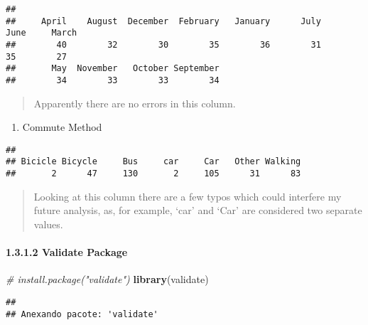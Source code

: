 \documentclass[
]{article}
\newenvironment{Shaded}{\begin{snugshade}}{\end{snugshade}}
\newcommand{\CommentTok}[1]{\textcolor[rgb]{0.56,0.35,0.01}{\textit{#1}}}
\newcommand{\FunctionTok}[1]{\textcolor[rgb]{0.13,0.29,0.53}{\textbf{#1}}}
\newcommand{\NormalTok}[1]{#1}
\newcommand{\SpecialCharTok}[1]{\textcolor[rgb]{0.81,0.36,0.00}{\textbf{#1}}}
\providecommand{\tightlist}{%
  \setlength{\itemsep}{0pt}\setlength{\parskip}{0pt}}
\begin{document}
\begin{verbatim}
## 
##     April    August  December  February   January      July      June     March 
##        40        32        30        35        36        31        35        27 
##       May  November   October September 
##        34        33        33        34
\end{verbatim}

\begin{quote}
Apparently there are no errors in this column.
\end{quote}

\begin{enumerate}
\def\labelenumi{\arabic{enumi}.}
\setcounter{enumi}{8}
\tightlist
\item
  Commute Method
\end{enumerate}

\begin{Shaded}
\end{Shaded}

\begin{verbatim}
## 
## Bicicle Bicycle     Bus     car     Car   Other Walking 
##       2      47     130       2     105      31      83
\end{verbatim}

\begin{quote}
Looking at this column there are a few typos which could interfere my
future analysis, as, for example, `car' and `Car' are considered two
separate values.
\end{quote}

\paragraph{1.3.1.2 Validate Package}\label{validate-package}

\begin{Shaded}
\begin{Highlighting}[]
\CommentTok{\# install.package("validate")}
\FunctionTok{library}\NormalTok{(validate)}
\end{Highlighting}
\end{Shaded}

\begin{verbatim}
## 
## Anexando pacote: 'validate'
\end{verbatim}
\end{document}
